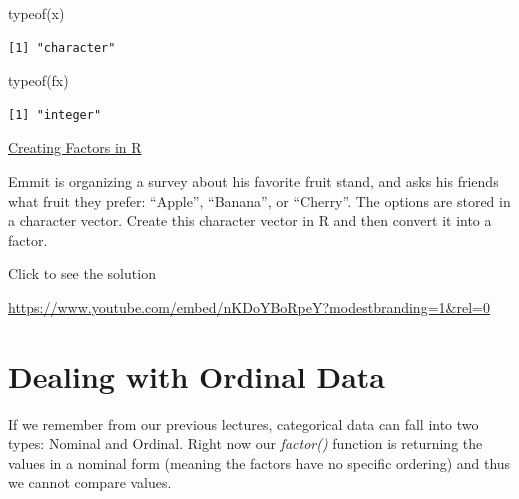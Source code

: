 \documentclass[
  letterpaper,
  DIV=11,
  numbers=noendperiod]{scrreprt}
\newenvironment{Shaded}{\begin{snugshade}}{\end{snugshade}}
\newcommand{\FunctionTok}[1]{\textcolor[rgb]{0.28,0.35,0.67}{#1}}
\newcommand{\NormalTok}[1]{\textcolor[rgb]{0.00,0.23,0.31}{#1}}
\begin{document}
\begin{Shaded}
\begin{Highlighting}[]
\FunctionTok{typeof}\NormalTok{(x)}
\end{Highlighting}
\end{Shaded}

\begin{verbatim}
[1] "character"
\end{verbatim}

\begin{Shaded}
\begin{Highlighting}[]
\FunctionTok{typeof}\NormalTok{(fx)}
\end{Highlighting}
\end{Shaded}

\begin{verbatim}
[1] "integer"
\end{verbatim}

\begin{watch}{}{}
    \href{https://youtu.be/UoPKvEKD9K4}{Creating Factors in R}
\end{watch}

\begin{tcolorbox}[enhanced jigsaw, colbacktitle=quarto-callout-tip-color!10!white, breakable, bottomrule=.15mm, colframe=quarto-callout-tip-color-frame, left=2mm, opacitybacktitle=0.6, title=\textcolor{quarto-callout-tip-color}{\faLightbulb}\hspace{0.5em}{Try it Out}, leftrule=.75mm, opacityback=0, rightrule=.15mm, titlerule=0mm, bottomtitle=1mm, colback=white, toprule=.15mm, arc=.35mm, toptitle=1mm, coltitle=black]

Emmit is organizing a survey about his favorite fruit stand, and asks
his friends what fruit they prefer: ``Apple'', ``Banana'', or
``Cherry''. The options are stored in a character vector. Create this
character vector in R and then convert it into a factor.

Click to see the solution

\url{https://www.youtube.com/embed/nKDoYBoRpeY?modestbranding=1&rel=0}

\end{tcolorbox}

\section{Dealing with Ordinal Data}\label{dealing-with-ordinal-data}

If we remember from our previous lectures, categorical data can fall
into two types: Nominal and Ordinal. Right now our \emph{factor()}
function is returning the values in a nominal form (meaning the factors
have no specific ordering) and thus we cannot compare values.
\end{document}

